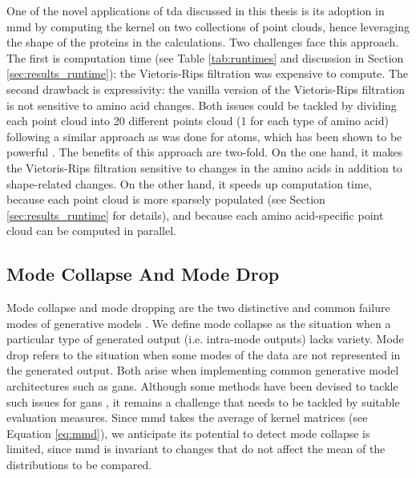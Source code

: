 One of the novel applications of \acrshort{tda} discussed in this thesis is its adoption in
\acrshort{mmd} by computing the kernel on two collections of point clouds, hence leveraging
the shape of the proteins in the calculations. Two challenges face this
approach. The first is computation time (see Table \ref{tab:runtimes} and
discussion in Section \ref{sec:results_runtime}): the Vietoris-Rips filtration
was expensive to compute. The second drawback is expressivity: the vanilla
version of the Vietoris-Rips filtration is not sensitive to amino acid changes.
Both issues could be tackled by dividing each point cloud into 20 different
points cloud (1 for each type of amino acid) following a similar approach as was
done for atoms, which has been shown to be powerful \cite{jiang2021topological}.
The benefits of this approach are two-fold. On the one hand, it makes the
Vietoris-Rips filtration sensitive to changes in the amino acids in addition to
shape-related changes. On the other hand, it
speeds up computation time, because each point cloud is more sparsely populated
(see Section \ref{sec:results_runtime} for details), and because
each amino acid-specific point cloud can be computed in parallel.


\subsection{Mode Collapse And Mode Drop}\label{sec:mode_collapse_mode_drop}

Mode collapse and mode dropping are the two distinctive and common failure modes
of generative models \citep{salimans2016improved}. We define mode collapse as
the situation when a particular type of generated output (i.e. intra-mode
outputs) lacks variety. Mode drop refers to the situation when some modes of the
data are not represented in the generated output. Both arise when implementing
common generative model architectures such as \acrshort{gans}. Although some
methods have been devised to tackle such issues for \acrshort{gans}
\citep{arjovsky2017wasserstein, goodfellow2014generative}, it remains a
challenge that needs to be tackled by suitable evaluation measures. Since
\acrshort{mmd} takes the average of kernel matrices (see Equation \ref{eq:mmd}),
we anticipate its potential to detect mode collapse is limited, since
\acrshort{mmd} is invariant to changes that do not affect the mean of the
distributions to be compared.

